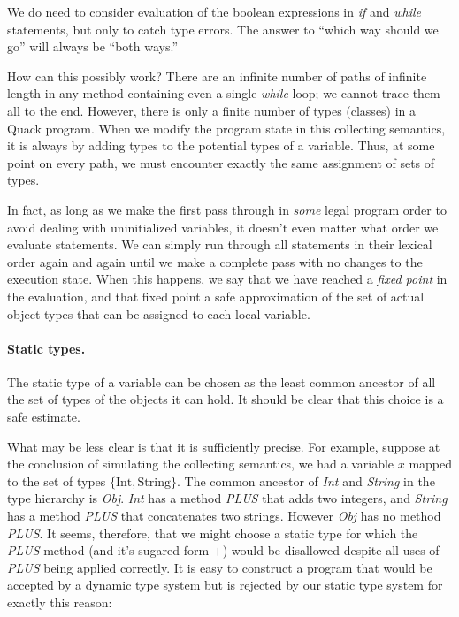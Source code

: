 \documentclass[11pt]{article}
\begin{document}
We do need to consider evaluation of the boolean expressions in
\emph{if} and \emph{while} statements, but only to catch type errors.
The answer to ``which way should we go'' will always be ``both ways.'' 

How can this possibly work?  There are an infinite number of paths of
infinite length in any method containing even a single \emph{while}
loop; we cannot trace them all to the end.  However, there is only a
finite number of types (classes) in a Quack program.  When we modify
the program state in this collecting semantics, it is always by adding
types to the potential types 
of a variable.  Thus, at some point on every path, we must encounter
exactly the same assignment of sets of types. 

In fact, as long as we make the first pass through in \emph{some}
legal program order to avoid dealing with uninitialized variables, it
doesn't even matter what order we evaluate statements.  We can simply
run through all statements in their lexical order again and again
until we make a complete pass with no changes to the execution state.  
When this happens, we say that we have reached a \emph{fixed point} in
the evaluation, and that fixed point a safe approximation of the set
of actual object types that can be assigned to each local variable. 

\paragraph{Static types.}  The static type of a variable can be chosen
as the least common ancestor of all the set of types of the objects it
can hold.  It should be clear that this choice is a safe estimate.

What may be less clear is that it is sufficiently precise.  For
example, suppose at the conclusion of simulating the collecting
semantics, we had a variable $x$ mapped to the set of types 
\( \{  \mbox{Int}, \mbox{String} \} \).  The common ancestor of
\emph{Int} and \emph{String} in the type hierarchy is
\emph{Obj}. \emph{Int} has a method \emph{PLUS} that adds two
integers, and \emph{String} has a method \emph{PLUS} that concatenates
two strings.  However \emph{Obj} has no method \emph{PLUS}.  It seems,
therefore, that we might choose a static type for which the
\emph{PLUS} method (and it's  sugared form $+$) would be disallowed
despite all uses of \emph{PLUS} being applied correctly.  It is easy
to construct a program that would be accepted by a dynamic type system
but is rejected by our static type system for exactly this reason: 
\end{document}
